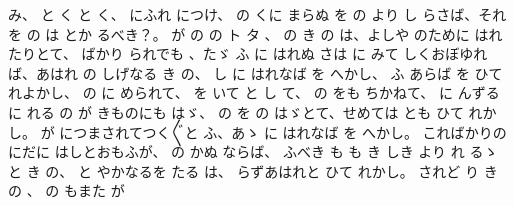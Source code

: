 み、
と
く
と
く、
にふれ
につけ、
の
くに
まらぬ
を
の
より
し
らさば、それを
の
は
とか
るべき？。
が
の
の
ト
タ
、
の
き
の
は、よしや
のために
はれたりとて、
ばかり
られでも
、たゞ
ふ
に
はれぬ
さは
に
みて
しくおぼゆれば、あはれ
の
しげなる
き
の、
し
に
はれなば
を
へかし、
ふ
あらば
を
ひて
れよかし、
の
に
められて、
を
いて
と
し
て、
の
をも
ちかねて、
に
んずるに
れる
の
が
きものにも
はゞ、
の
を
の
はゞとて、せめては
とも
ひて
れかし。
が
につまされてつく〴〵と
ふ、あゝ
に
はれなば
を
へかし。
こればかりの
にだに
はしとおもふが、
の
かぬ
ならば、
ふべき
も
も
き
しき
より
れ
るゝ
と
き
の、
と
やかなるを
たる
は、
らずあはれと
ひて
れかし。
されど
り
き
の
、
の
もまた
が
